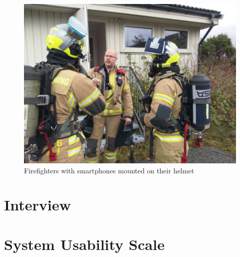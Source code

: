 \documentclass[../Main/thesis.tex]{subfiles}
\begin{document}
\begin{figure}[h]
	\centering
	\includegraphics[width=\textwidth]{../fig/firefighters-with-helmet}
	\caption{Firefighters with smartphones mounted on their helmet}
	\label{fig:eval-firefighters}
\end{figure}

\section{Interview}

\section{System Usability Scale}
\end{document}
